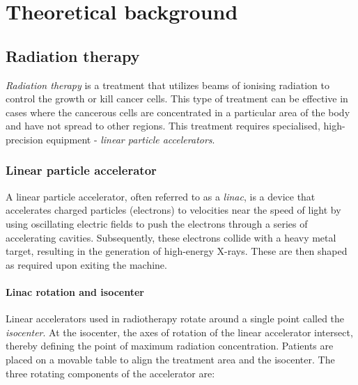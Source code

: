 \chapter{Theoretical background} \label{chr:theory}

\section{Radiation therapy}

\emph{Radiation therapy} is a treatment that utilizes beams of ionising radiation to control the growth or kill cancer cells. This type of treatment can be effective in cases where the cancerous cells are concentrated in a particular area of the body and have not spread to other regions. This treatment requires specialised, high-precision equipment - \emph{linear particle accelerators}. \cite{abeloff_clinical_oncology}

\subsection{Linear particle accelerator}

A linear particle accelerator, often referred to as a \emph{linac}, is a device that accelerates charged particles (electrons) to velocities near the speed of light by using oscillating electric fields to push the electrons through a series of accelerating cavities. Subsequently, these electrons collide with a heavy metal target, resulting in the generation of high-energy X-rays. These are then shaped as required upon exiting the machine. \cite{how_linac_work}

\subsubsection{Linac rotation and isocenter}

Linear accelerators used in radiotherapy rotate around a single point called the \emph{isocenter}. At the isocenter, the axes of rotation of the linear accelerator intersect, thereby defining the point of maximum radiation concentration. Patients are placed on a movable table to align the treatment area and the isocenter. The three rotating components of the accelerator are:

